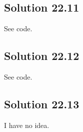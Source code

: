 \subsection*{Solution 22.11}

See code.


\subsection*{Solution 22.12}

See code.


\subsection*{Solution 22.13}

I have no idea.
